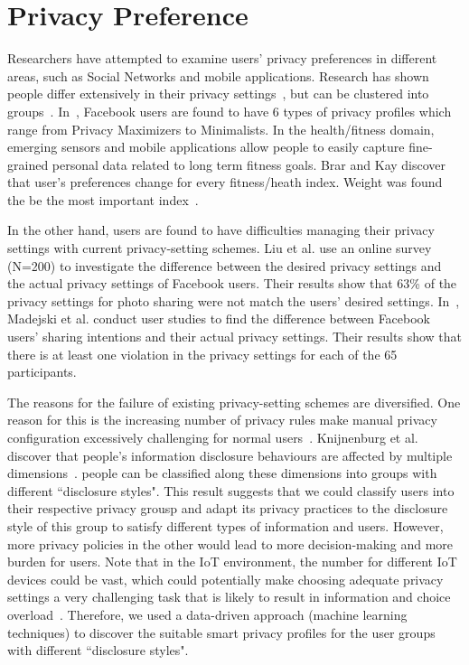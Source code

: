 \section{Privacy Preference}
Researchers have attempted to examine users' privacy preferences in different areas, such as Social Networks and mobile applications. Research has shown people differ extensively in their privacy settings~\cite{olson2005study}, but can be clustered into groups~\cite{anthony2007privacy,knijnenburg2013dimensionality}. In~\cite{wisniewski2014profiling, knijnenburg2017privacy}, Facebook users are found to have 6 types of privacy profiles which range from Privacy Maximizers to Minimalists. In the health/fitness domain, emerging sensors and mobile applications allow people to easily capture fine-grained personal data related to long term fitness goals. Brar and Kay discover that user's preferences change for every fitness/heath index. Weight was found the be the most important index~\cite{brar2004privacy}. 

In the other hand, users are found to have difficulties managing their privacy settings with current privacy-setting schemes. Liu et al. use an online survey (N=200) to investigate the difference between the desired privacy settings and the actual privacy settings of Facebook users. Their results show that 63\% of the privacy settings for photo sharing were not match the users' desired settings. In~\cite{madejski2012study}, Madejski et al. conduct user studies to find the difference between Facebook users’ sharing intentions and their actual privacy settings. Their results show that there is at least one violation in the privacy settings for each of the 65 participants.

The reasons for the failure of existing privacy-setting schemes are diversified. One reason for this is the increasing number of privacy rules make manual privacy configuration excessively challenging for normal users~\cite{furnell2015managing}. Knijnenburg et al. discover that people’s information disclosure behaviours
are affected by multiple dimensions~\cite{knijnenburg2013dimensionality}. people can be classified along these dimensions into groups with different ``disclosure styles". This result suggests that we could classify users into their respective privacy grousp and adapt its privacy practices to the disclosure style of this group to satisfy different types of information and users. However, more privacy policies in the other would lead to more decision-making and more burden for users. Note that in the IoT environment, the number for different IoT devices could be vast, which could potentially make choosing adequate privacy settings a very challenging task that is likely to result in information and choice overload~\cite{williams2016perfect}. Therefore, we used a data-driven approach (machine learning techniques) to discover the suitable smart privacy profiles for the user groups with different ``disclosure styles".


